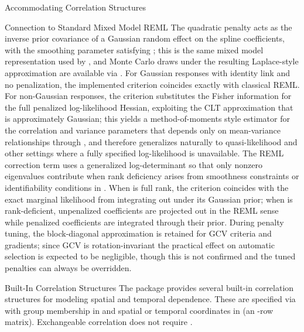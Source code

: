 \begin{Section}{Accommodating Correlation Structures}
%
\begin{SubSection}{Connection to Standard Mixed Model REML}
The quadratic penalty \eqn{\boldsymbol{\Lambda}}{} acts as the inverse prior
covariance of a Gaussian random effect on the spline coefficients, with
the smoothing parameter satisfying ;
this is the same mixed model representation used by , and
Monte Carlo draws under the resulting Laplace-style approximation are
available via . For Gaussian responses
with identity link and no penalization, the implemented criterion
coincides exactly with classical REML. For non-Gaussian responses, the
criterion substitutes the Fisher information for the full penalized
log-likelihood Hessian, exploiting the CLT approximation that
 is
approximately Gaussian; this yields a method-of-moments style estimator
for the correlation and variance parameters that depends only on
mean-variance relationships through , and therefore
generalizes naturally to quasi-likelihood and other settings where a
fully specified log-likelihood is unavailable. The REML correction term
 uses a
generalized log-determinant so that only nonzero eigenvalues contribute
when rank deficiency arises from smoothness constraints or
identifiability conditions in . When
\eqn{\boldsymbol{\Lambda}}{} is full rank, the criterion coincides with
the exact marginal likelihood from integrating out
\eqn{\boldsymbol{\beta}}{} under its Gaussian prior; when
\eqn{\boldsymbol{\Lambda}}{} is rank-deficient, unpenalized coefficients
are projected out in the REML sense while penalized coefficients are
integrated through their prior. During penalty tuning, the block-diagonal
approximation is retained for GCV criteria and gradients; since GCV is
rotation-invariant the practical effect on automatic selection is expected
to be negligible, though this is not confirmed and the tuned penalties can
always be overridden.
\end{SubSection}


%
\begin{SubSection}{Built-In Correlation Structures}
The package provides several built-in correlation structures for modeling
spatial and temporal dependence. These are specified via
 with group membership in 
and spatial or temporal coordinates in  (an -row
matrix). Exchangeable correlation does not require .


\end{SubSection}
\end{Section}
